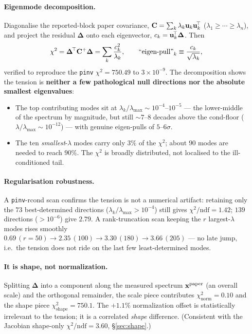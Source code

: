 \paragraph{Eigenmode decomposition.}
Diagonalise the reported-block paper covariance,
$\mathbf{C}=\sum_{k}\lambda_{k}\mathbf{u}_{k}\mathbf{u}_{k}^{\!\top}$
($\lambda_{1}\!\ge\!\cdots\!\ge\!\lambda_{n}$), and project the residual
$\boldsymbol{\Delta}$ onto each eigenvector, $c_{k}=\mathbf{u}_{k}^{\!\top}\boldsymbol{\Delta}$.
Then
\begin{equation}
\chi^{2}=\boldsymbol{\Delta}^{\!\top}\mathbf{C}^{+}\boldsymbol{\Delta}
=\sum_{k}\frac{c_{k}^{2}}{\lambda_{k}},
\qquad
\text{``eigen-pull''}_{k}\equiv\frac{c_{k}}{\sqrt{\lambda_{k}}},
\end{equation}
verified to reproduce the \texttt{pinv} $\chi^{2}=750.49$ to $3\times10^{-9}$.
The decomposition shows the tension is \textbf{neither a few pathological
null directions nor the absolute smallest eigenvalues}:
\begin{itemize}[nosep]
  \item The top contributing modes sit at $\lambda_{k}/\lambda_{\max}\sim
        10^{-4}$--$10^{-5}$ --- the lower-middle of the spectrum by
        magnitude, but still $\sim7$--$8$ decades above the cond-floor
        ($\lambda/\lambda_{\max}\sim10^{-12}$) --- with genuine eigen-pulls
        of $5$--$6\sigma$.
  \item The ten \emph{smallest}-$\lambda$ modes carry only $3\%$ of the
        $\chi^{2}$; about $90$ modes are needed to reach $90\%$. The
        $\chi^{2}$ is broadly distributed, not localised to the
        ill-conditioned tail.
\end{itemize}

\paragraph{Regularisation robustness.}
A \texttt{pinv}-rcond scan confirms the tension is not a numerical artifact:
retaining only the $73$ best-determined directions
($\lambda_{k}/\lambda_{\max}>10^{-4}$) still gives $\chi^{2}/\mathrm{ndf}=1.42$;
$139$ directions ($>10^{-6}$) give $2.79$. A rank-truncation scan keeping the
$r$ largest-$\lambda$ modes rises smoothly $0.69\,(r{=}50)\to2.35\,(100)\to
3.30\,(180)\to3.66\,(205)$ --- no late jump, i.e.\ the tension does not ride on
the last few least-determined modes.

\paragraph{It is shape, not normalization.}
Splitting $\boldsymbol{\Delta}$ into a component along the measured
spectrum $\mathbf{x}^{\text{paper}}$ (an overall scale) and the orthogonal
remainder, the scale piece contributes $\chi^{2}_{\mathrm{norm}}=0.10$ and the
shape piece $\chi^{2}_{\text{shape}}=750.1$. The $+1.1\%$ normalization
offset is statistically irrelevant to the tension; it is a correlated
\emph{shape} difference. (Consistent with the Jacobian shape-only
$\chi^{2}/\mathrm{ndf}=3.60$, \S\ref{sec:shape}.)

